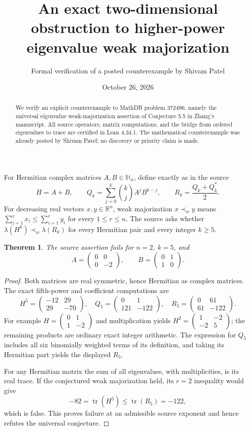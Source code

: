 \documentclass[11pt]{article}
\title{An exact two-dimensional obstruction to higher-power eigenvalue weak majorization}
\author{Formal verification of a posted counterexample by Shivam Patel}
\date{October 26, 2026}
\newtheorem{theorem}{Theorem}
\newcommand{\tr}{\operatorname{tr}}
\begin{document}
\maketitle
\begin{abstract}
We verify an explicit counterexample to MathDB problem 372496, namely the universal eigenvalue weak-majorization assertion of Conjecture 5.5 in Zhang's manuscript. All source operators, matrix computations, and the bridge from ordered eigenvalues to trace are certified in Lean 4.34.1. The mathematical counterexample was already posted by Shivam Patel; no discovery or priority claim is made.
\end{abstract}
For Hermitian complex matrices $A,B\in\mathbb H_n$, define exactly as in the source
\[
 H=A+B,\qquad Q_k=\sum_{j=0}^k\binom{k}{j}A^jB^{k-j},\qquad R_k=\frac{Q_k+Q_k^*}{2}.
\]
For decreasing real vectors $x,y\in\mathbb R^n$, weak majorization $x\prec_w y$ means $\sum_{i=1}^r x_i\leq\sum_{i=1}^r y_i$ for every $1\leq r\leq n$. The source asks whether $\lambda(H^k)\prec_w\lambda(R_k)$ for every Hermitian pair and every integer $k\geq5$.
\begin{theorem}
The source assertion fails for $n=2$, $k=5$, and
\[
 A=\begin{pmatrix}0&0\\0&-2\end{pmatrix},\qquad
 B=\begin{pmatrix}0&1\\1&0\end{pmatrix}.
\]
\end{theorem}
\begin{proof}
Both matrices are real symmetric, hence Hermitian as complex matrices. The exact fifth-power and coefficient computations are
\[
 H^5=\begin{pmatrix}-12&29\\29&-70\end{pmatrix},\quad
 Q_5=\begin{pmatrix}0&1\\121&-122\end{pmatrix},\quad
 R_5=\begin{pmatrix}0&61\\61&-122\end{pmatrix}.
\]
For example $H=\left(\begin{smallmatrix}0&1\\1&-2\end{smallmatrix}\right)$ and multiplication yields $H^2=\left(\begin{smallmatrix}1&-2\\-2&5\end{smallmatrix}\right)$; the remaining products are ordinary exact integer arithmetic. The expression for $Q_5$ includes all six binomially weighted terms of its definition, and taking its Hermitian part yields the displayed $R_5$.

For any Hermitian matrix the sum of all eigenvalues, with multiplicities, is its real trace. If the conjectured weak majorization held, its $r=2$ inequality would give
\[
 -82=\tr(H^5)\leq\tr(R_5)=-122,
\]
which is false. This proves failure at an admissible source exponent and hence refutes the universal conjecture.
\end{proof}
\end{document}
